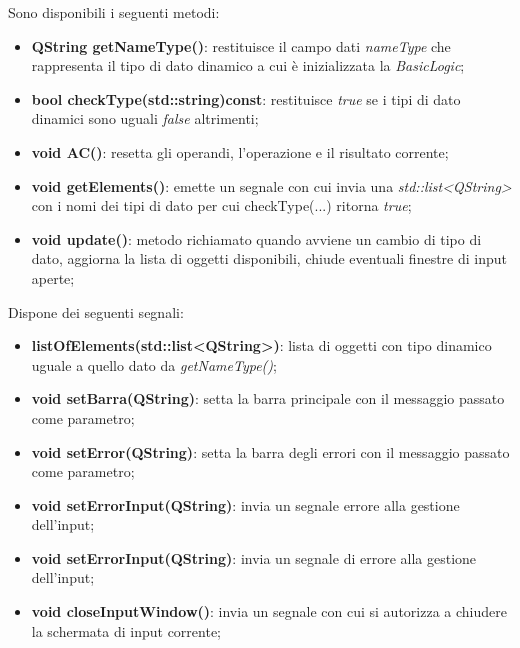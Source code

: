 \documentclass[a4paper,10pt]{article}
\begin{document}
        Sono disponibili i seguenti metodi:
        \begin{itemize}
            \item \textbf{QString getNameType()}: restituisce il campo dati \textit{nameType} che rappresenta il tipo di dato dinamico a cui è inizializzata la \textit{BasicLogic};
            \item \textbf{bool checkType(std::string)const}: restituisce \textit{true} se i tipi di dato dinamici sono uguali \textit{false} altrimenti;
            \item \textbf{void AC()}: resetta gli operandi, l'operazione e il risultato corrente;
            \item \textbf{void getElements()}: emette un segnale con cui invia una \textit{std::list<QString>} con i nomi dei tipi di dato per cui checkType(...) ritorna \textit{true};
            \item \textbf{void update()}: metodo richiamato quando avviene un cambio di tipo di dato, aggiorna la lista di oggetti disponibili, chiude eventuali finestre di input aperte;
        \end{itemize}
        Dispone dei seguenti segnali:
        \begin{itemize}
            \item \textbf{listOfElements(std::list<QString>)}: lista di oggetti con tipo dinamico uguale a quello dato da \textit{getNameType()};
            \item \textbf{void setBarra(QString)}: setta la barra principale con il messaggio passato come parametro;
            \item \textbf{void setError(QString)}: setta la barra degli errori con il messaggio passato come parametro;
            \item \textbf{void setErrorInput(QString)}: invia un segnale errore alla gestione dell'input;
            \item \textbf{void setErrorInput(QString)}: invia un segnale di errore alla gestione dell'input;
            \item \textbf{void closeInputWindow()}: invia un segnale con cui si autorizza a chiudere la schermata di input corrente;
        \end{itemize}
\end{document}
